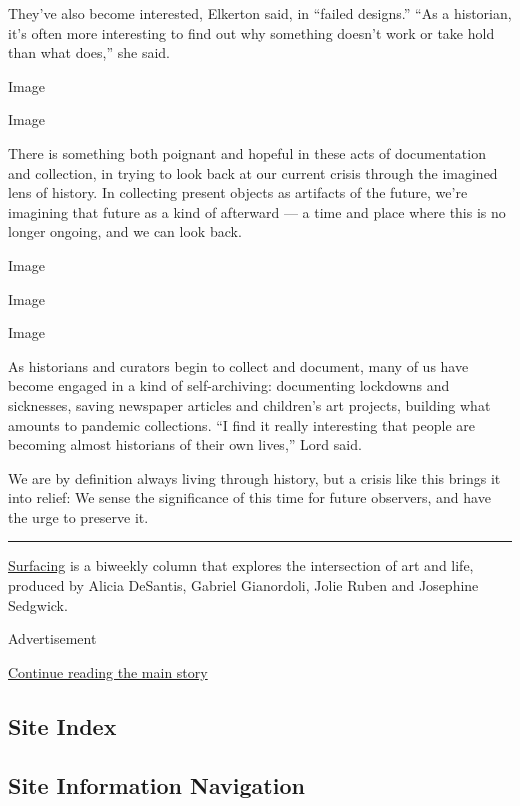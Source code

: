 They've also become interested, Elkerton said, in ``failed designs.''
``As a historian, it's often more interesting to find out why something
doesn't work or take hold than what does,'' she said.

Image

Image

There is something both poignant and hopeful in these acts of
documentation and collection, in trying to look back at our current
crisis through the imagined lens of history. In collecting present
objects as artifacts of the future, we're imagining that future as a
kind of afterward --- a time and place where this is no longer ongoing,
and we can look back.

Image

Image

Image

As historians and curators begin to collect and document, many of us
have become engaged in a kind of self-archiving: documenting lockdowns
and sicknesses, saving newspaper articles and children's art projects,
building what amounts to pandemic collections. ``I find it really
interesting that people are becoming almost historians of their own
lives,'' Lord said.

We are by definition always living through history, but a crisis like
this brings it into relief: We sense the significance of this time for
future observers, and have the urge to preserve it.

\begin{center}\rule{0.5\linewidth}{\linethickness}\end{center}

\href{https://www.nytimes3xbfgragh.onion/series/surfacing}{Surfacing} is
a biweekly column that explores the intersection of art and life,
produced by Alicia DeSantis, Gabriel Gianordoli, Jolie Ruben and
Josephine Sedgwick.

Advertisement

\protect\hyperlink{after-bottom}{Continue reading the main story}

\hypertarget{site-index}{%
\subsection{Site Index}\label{site-index}}

\hypertarget{site-information-navigation}{%
\subsection{Site Information
Navigation}\label{site-information-navigation}}

